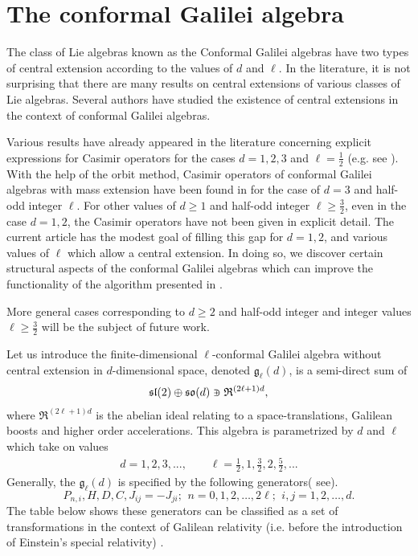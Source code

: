 \documentclass[12pt]{article}
\begin{document}
\section{The conformal Galilei algebra}
The class of Lie algebras known as the  Conformal Galilei algebras have two
types of central extension according to the values of $d$ and $\ell$.
In the literature, it is  not surprising that there are many results on
central extensions of various classes of Lie algebras. Several authors have
studied  the  existence of central extensions  in the context of conformal
Galilei algebras\cite{Ai12, Ai13,Lev71,Bar54, Ho14 ,Mar10,Luk97, Luk06,
Luk7}.

Various results have already appeared in the literature concerning explicit
expressions for Casimir
operators for the cases  $d=1,2,3$ and $\ell= \frac{1}{2}$ (e.g. see 
\cite{Ai10, Ca05 , Hen97 , Pe77} ). With the help of the orbit method,
Casimir operators of  conformal Galilei algebras with mass extension have been
found in \cite{An12} for the case of $d=3$ and  half-odd integer $\ell$. For
other values of $d\geq1$ and half-odd integer $\ell\geq \frac{3}{2}$, even in
the case $d=1,2$, the Casimir operators have not been given in explicit detail.
The current article has the modest goal of filling this gap for $d=1,2$, and
various values of $\ell$ which allow a central extension. In doing so,
we discover certain structural aspects of the conformal Galilei algebras which can
improve the functionality of the algorithm presented in \cite{Als17}.

More general cases corresponding to $d\geq2$ and half-odd integer and
integer values $\ell\geq \frac{3}{2}$ will be the subject of future work. 

Let us introduce the finite-dimensional $\ell$-conformal Galilei algebra
without central extension in $d$-dimensional space, denoted $
\mathfrak{{g}}_\ell(d)$, is a semi-direct sum of
\begin{eqnarray*}
\mathfrak{sl}(2)\oplus \mathfrak{so}(d) \niplus  \mathfrak{R}^{(2\ell+1)d},     
\end{eqnarray*}
where $\mathfrak{R}^{(2\ell+1)d}$  is the abelian ideal relating to a space-translations, Galilean boosts and higher order accelerations. 
 This algebra is parametrized by  $d$ and $\ell$ which take on values
\begin{eqnarray*}
d = 1, 2, 3, . . ., \qquad \ell=\frac{1}{2}, 1, \frac{3}{2}, 2, \frac{5}{2}, . . .
\end{eqnarray*}
Generally, the $\mathfrak{{g}}_\ell(d)$ is specified by the following generators( see\cite{Ai12,Ai11,Ai13,Ai10}).
\begin{equation*}
	{ P_{n,i}, H, D, C, J_{ij}=-J_{ji}; \,\ n = 0,1, 2, \ldots, 2\ell; \,\
	i,j =1, 2, \ldots,  d.}
\end{equation*}
The table below shows these generators can be classified as a set of transformations in the context of Galilean relativity (i.e. before the introduction of Einstein's special relativity)  \cite{ Mar10,Ne97}.
\end{document}
